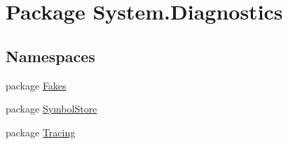 \hypertarget{namespace_system_1_1_diagnostics}{\section{Package System.\-Diagnostics}
\label{namespace_system_1_1_diagnostics}
}
\subsection*{Namespaces}
\begin{DoxyCompactItemize}
\item 
package \hyperlink{namespace_system_1_1_diagnostics_1_1_fakes}{Fakes}
\item 
package \hyperlink{namespace_system_1_1_diagnostics_1_1_symbol_store}{Symbol\-Store}
\item 
package \hyperlink{namespace_system_1_1_diagnostics_1_1_tracing}{Tracing}
\end{DoxyCompactItemize}
